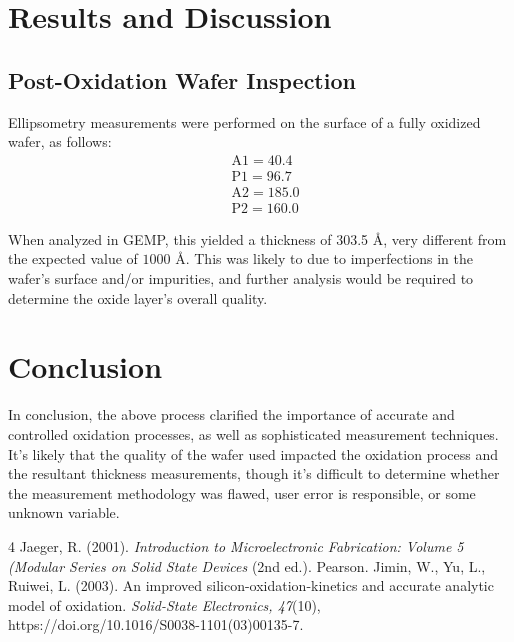 \documentclass[12pt]{report}
\begin{document}
\section{Results and Discussion}
\subsection{Post-Oxidation Wafer Inspection}
Ellipsometry measurements were performed on the surface of a fully oxidized wafer, as follows: 
\begin{align*}
  &\mathrm{A1} = 40.4 \\
  &\mathrm{P1} = 96.7 \\
  &\mathrm{A2} = 185.0 \\
  &\mathrm{P2} = 160.0 
\end{align*}

When analyzed in GEMP, this yielded a thickness of 303.5 \AA, very different from the expected value of \(1000\) \AA. This was likely to due to imperfections in the wafer's surface and/or impurities, and further analysis would be required to determine the oxide layer's overall quality.

\section{Conclusion}

In conclusion, the above process clarified the importance of accurate and controlled oxidation processes, as well as sophisticated measurement techniques. It's likely that the quality of the wafer used impacted the oxidation process and the resultant thickness measurements, though it's difficult to determine whether the measurement methodology was flawed, user error is responsible, or some unknown variable.

\begin{thebibliography}{4}
	 Jaeger, R. (2001). \textit{Introduction to Microelectronic Fabrication: Volume 5 (Modular Series on Solid State Devices} (2nd ed.). Pearson.
	 Jimin, W., Yu, L., Ruiwei, L. (2003). An improved silicon-oxidation-kinetics and accurate analytic model of oxidation. \textit{Solid-State Electronics, 47}(10), https://doi.org/10.1016/S0038-1101(03)00135-7.
\end{thebibliography}
\end{document}
